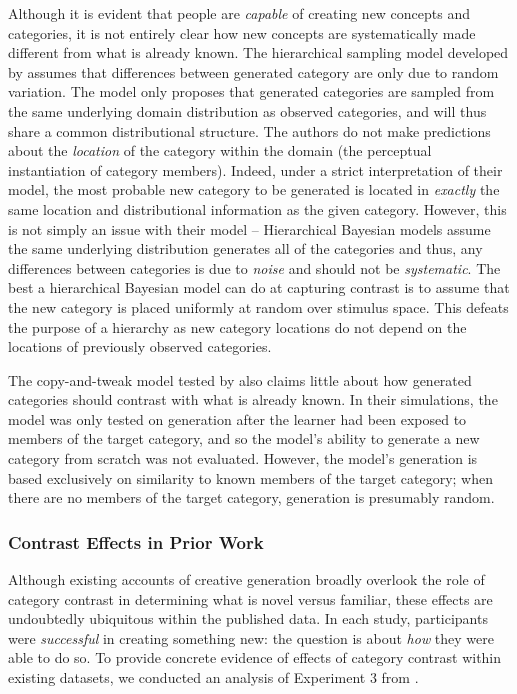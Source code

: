 \documentclass[12pt]{article}
\begin{document}
\begin{flushleft}
Although it is evident that people are \textit{capable} of creating new concepts and categories, it is not entirely clear how new concepts are systematically made different from what is already known. The hierarchical sampling model developed by \cite{jern2013probabilistic} assumes that differences between generated category are only due to random variation. The model only proposes that generated categories are sampled from the same underlying domain distribution as observed categories, and will thus share a common distributional structure. The authors do not make predictions about the \textit{location} of the category within the domain (the perceptual instantiation of category members). Indeed, under a strict interpretation of their model, the most probable new category to be generated is located in {\em exactly} the same location and distributional information as the given category. However, this is not simply an issue with their model -- Hierarchical Bayesian models assume the same underlying distribution generates all of the categories and thus, any differences between categories is due to {\em noise} and should not be {\em systematic}. The best a hierarchical Bayesian model can do at capturing contrast is to assume that the new category is placed uniformly at random over stimulus space. This defeats the purpose of a hierarchy as new category locations do not depend on the locations of previously observed categories.

The copy-and-tweak model tested by \cite{jern2013probabilistic} also claims little about how generated categories should contrast with what is already known. In their simulations, the model was only tested on generation after the learner had been exposed to members of the target category, and so the model's ability to generate a new category from scratch was not evaluated. However, the model's generation is based exclusively on similarity to known members of the target category; when there are no members of the target category, generation is presumably random.

\subsubsection{Contrast Effects in Prior Work}

Although existing accounts of creative generation broadly overlook the role of category contrast in determining what is novel versus familiar, these effects are undoubtedly ubiquitous within the published data. In each study, participants were \textit{successful} in creating something new: the question is about \textit{how} they were able to do so. To provide concrete evidence of  effects of category contrast within existing datasets, we conducted an analysis of Experiment 3 from \cite{jern2013probabilistic}. 


\end{flushleft}
\end{document}
